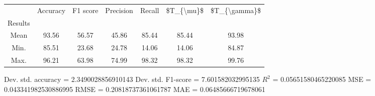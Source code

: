 \begin{tabular}{|c|c|c|c|c|c|c|}
\toprule
{} &  Accuracy &  F1 score &  Precision &  Recall &  \$T\_\{\textbackslash mu\}\$ &  \$T\_\{\textbackslash gamma\}\$ \\
Results &           &           &            &         &            &               \\
\hline
Mean    &     93.56 &     56.57 &      45.86 &   85.44 &      85.44 &         93.98 \\
Min.    &     85.51 &     23.68 &      24.78 &   14.06 &      14.06 &         84.87 \\
Max.    &     96.21 &     63.98 &      74.99 &   98.32 &      98.32 &         99.76 \\
\bottomrule
\end{tabular}

 Dev. std. accuracy = 2.3490028856910143
 Dev. std. F1-score = 7.601582032995135
 $R^2$ = 0.05651580465220085
 MSE = 0.043341982530886995
 RMSE = 0.20818737361061787
 MAE = 0.06485666719678061
